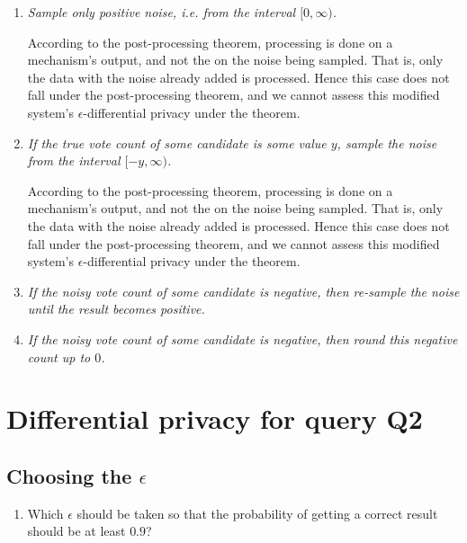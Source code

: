 \documentclass[parskip=half]{scrartcl}
\begin{document}
\begin{enumerate}
    \item \textit{Sample only positive noise, i.e. from the interval
    $[0, \infty)$.}

    According to the post-processing theorem, processing is done on a
    mechanism's output, and not the on the noise being sampled. That is, only
    the data with the noise already added is processed. Hence this case does
    not fall under the post-processing theorem, and we cannot assess this
    modified system's $\epsilon$-differential privacy under the theorem.

    \item \textit{If the true vote count of some candidate is some value $y$,
    sample the noise from the interval $[-y, \infty)$.}

    According to the post-processing theorem, processing is done on a
    mechanism's output, and not the on the noise being sampled. That is, only
    the data with the noise already added is processed. Hence this case does
    not fall under the post-processing theorem, and we cannot assess this
    modified system's $\epsilon$-differential privacy under the theorem.

    \item \textit{If the noisy vote count of some candidate is negative, then
    re-sample the noise until the result becomes positive.}
    \item \textit{If the noisy vote count of some candidate is negative, then
    round this negative count up to $0$.}
\end{enumerate}

\section{Differential privacy for query Q2}

\subsection{Choosing the \texorpdfstring{$\epsilon$}{ε}}

\begin{enumerate}
    \item Which $\epsilon$ should be taken so that the probability of getting a
    correct result should be at least $0.9$?


\end{enumerate}
\end{document}
